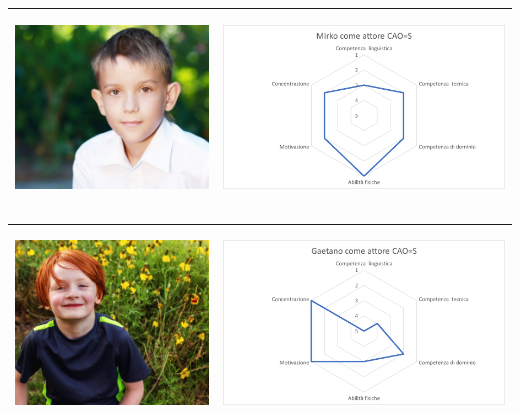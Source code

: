 \documentclass[../Report.tex]{subfiles}
\begin{document}
    \begin{table}[H]
        \begin{tabular}{|c|c|}
            \hline
            \includegraphics[height=5cm]{Mirko.jpg} & \includegraphics[height=5cm]{MirkoCAOS.png} \\
            \hline
        \end{tabular}
    \end{table}

    \begin{table}[H]
        \begin{tabular}{|c|c|}
            \hline
            \includegraphics[height=5cm]{Gaetano.jpg} & \includegraphics[height=5cm]{GaetanoCAOS.png} \\
            \hline
        \end{tabular}
    \end{table}
\end{document}
